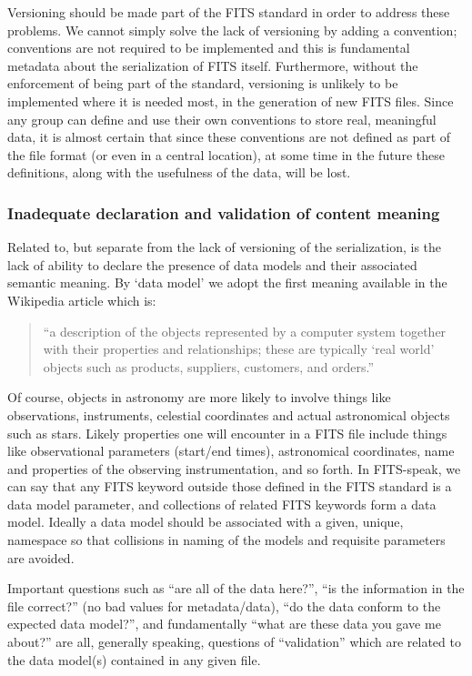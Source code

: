 \documentclass[final,authoryear,5p,times,twocolumn]{elsarticle}
\begin{document}
Versioning should be made part of the FITS standard in order to
address these problems. We cannot simply solve the lack of versioning
by adding a convention; conventions are not required to be implemented
and this is fundamental metadata about the serialization of FITS
itself. Furthermore, without the enforcement of being part of the
standard, versioning is unlikely to be implemented where it is needed
most, in the generation of new FITS files. Since any group can define
and use their own conventions to store real, meaningful data, it is
almost certain that since these conventions are not defined as part of
the file format (or even in a central location), at some time in the
future these definitions, along with the usefulness of the data, will
be lost.


\subsubsection{Inadequate declaration and validation of content meaning}


Related to, but separate from the lack of versioning of the
serialization, is the lack of ability to declare the presence of data
models and their associated semantic meaning.  By `data model' we
adopt the first meaning available in the Wikipedia article which is:

\begin{quote}
``a description of the objects represented by a computer system
together with their properties and relationships; these are typically
`real world' objects such as products, suppliers, customers, and
orders.''
\end{quote}


Of course, objects in astronomy are more likely to involve things like
observations, instruments, celestial coordinates and actual astronomical
objects such as stars. Likely properties one will encounter in a FITS
file include things like observational parameters (start/end times),
astronomical coordinates, name and properties of the observing
instrumentation, and so forth. In FITS-speak, we can say that any FITS
keyword outside those defined in the FITS standard is a data model
parameter, and collections of related FITS keywords form a data model.
Ideally a data model should be associated with a given, unique,
namespace so that collisions in naming of the models and requisite
parameters are avoided.


Important questions such as ``are all of the data here?'', ``is the
information in the file correct?'' (no bad values for metadata/data),
``do the data conform to the expected data model?'', and fundamentally
``what are these data you gave me about?'' are all, generally speaking,
questions of ``validation'' which are related to the data model(s)
contained in any given file.
\end{document}
